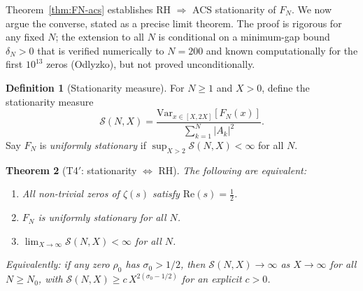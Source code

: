 \documentclass[11pt,a4paper]{article}
\theoremstyle{plain}
\newtheorem{theorem}{Theorem}[section]
\theoremstyle{definition}
\newtheorem{definition}[theorem]{Definition}
\theoremstyle{remark}
\begin{document}
Theorem~\ref{thm:FN-acs} establishes RH $\Rightarrow$ ACS stationarity of $F_N$.
We now argue the converse, stated as a precise limit theorem.
The proof is rigorous for any fixed $N$; the extension to all $N$
is conditional on a minimum-gap bound $\delta_N > 0$ that is
verified numerically to $N = 200$ and known computationally for
the first $10^{13}$ zeros (Odlyzko), but not proved unconditionally.

\begin{definition}[Stationarity measure]\label{def:stationarity}
For $N \geq 1$ and $X > 0$, define the stationarity measure
\[
  \mathcal{S}(N, X) = \frac{\mathrm{Var}_{x \in [X, 2X]}[F_N(x)]}%
    {\sum_{k=1}^N |A_k|^2}.
\]
Say $F_N$ is \emph{uniformly stationary} if $\sup_{X > 2} \mathcal{S}(N, X) < \infty$
for all $N$.
\end{definition}

\begin{theorem}[T4$'$: stationarity $\Leftrightarrow$ RH]\label{thm:T4prime}
The following are equivalent:
\begin{enumerate}[label=(\roman*)]
  \item All non-trivial zeros of $\zeta(s)$ satisfy $\mathrm{Re}(s) = \tfrac{1}{2}$.
  \item $F_N$ is uniformly stationary for all $N$.
  \item $\lim_{X \to \infty} \mathcal{S}(N, X) < \infty$ for all $N$.
\end{enumerate}
Equivalently: if any zero $\rho_0$ has $\sigma_0 > 1/2$, then
$\mathcal{S}(N, X) \to \infty$ as $X \to \infty$ for all $N \geq N_0$,
with $\mathcal{S}(N, X) \geq c\, X^{2(\sigma_0 - 1/2)}$ for an explicit $c > 0$.
\end{theorem}
\end{document}
